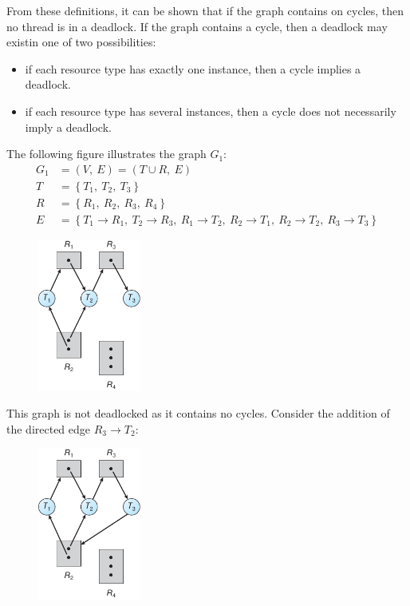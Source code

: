 \documentclass{article}
\begin{document}
From these definitions, it can be shown that if the graph contains on
cycles, then no thread is in a deadlock. If the graph contains a cycle,
then a deadlock may existin one of two possibilities:
\begin{itemize}
    \item if each resource type has exactly one instance, then a cycle
          implies a deadlock.
    \item if each resource type has several instances, then a cycle
          does not necessarily imply a deadlock.
\end{itemize}
The following figure illustrates the graph \(G_1\):
\begin{align*}
    G_1 & = \left( V,\: E \right) = \left( T \cup R,\: E \right) \\
    T   & = \left\{ T_1,\: T_2,\: T_3 \right\}                   \\
    R   & = \left\{ R_1,\: R_2,\: R_3,\: R_4 \right\}            \\
    E   & = \left\{
    T_1 \rightarrow R_1,\: T_2 \rightarrow R_3,\:
    R_1 \rightarrow T_2,\:
    R_2 \rightarrow T_1,\: R_2 \rightarrow T_2,\:
    R_3 \rightarrow T_3
    \right\}
\end{align*}
\begin{figure}[H]
    \centering
    \includegraphics[height = 5cm]{figures/resource_allocation_graph_1.pdf}
\end{figure}
This graph is not deadlocked as it contains no cycles. Consider the
addition of the directed edge \(R_3 \rightarrow T_2\):
\begin{figure}[H]
    \centering
    \includegraphics[height = 5cm]{figures/resource_allocation_graph_2.pdf}
\end{figure}
\end{document}
